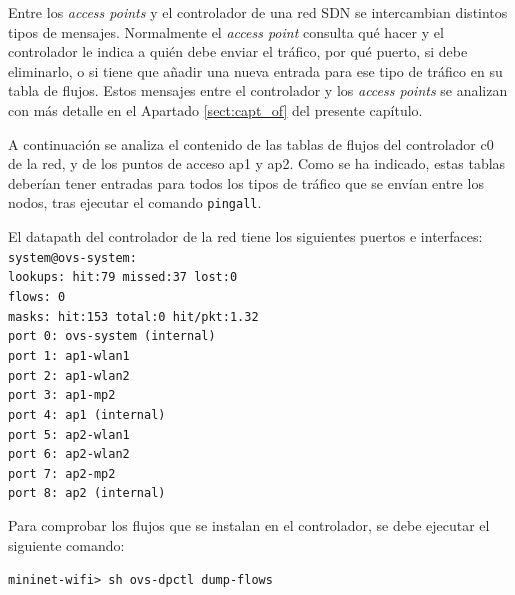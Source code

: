 \documentclass[a4paper,12pt,twoside,spanish]{book}
\begin{document}
Entre los \textit{access points} y el controlador de una red SDN se intercambian distintos tipos de mensajes. Normalmente el \textit{access point} consulta qué hacer y el controlador le indica a quién debe enviar el tráfico, por qué puerto, si debe eliminarlo, o si tiene que añadir una nueva entrada para ese tipo de tráfico en su tabla de flujos. Estos mensajes entre el controlador y los \textit{access points} se analizan con más detalle en el Apartado \ref{sect:capt_of} del presente capítulo.\par 

A continuación se analiza el contenido de las tablas de flujos del controlador c0 de la red, y de los puntos de acceso ap1 y ap2. Como se ha indicado, estas tablas deberían tener entradas para todos los tipos de tráfico que se envían entre los nodos, tras ejecutar el comando \texttt{pingall}.\par 

\hspace{0.5cm}

El datapath del controlador de la red tiene los siguientes puertos e interfaces:
\texttt{\\
\noindent system@ovs-system:\\
	\indent lookups: hit:79 missed:37 lost:0\\
	\indent	flows: 0\\
	\indent	masks: hit:153 total:0 hit/pkt:1.32\\
	\indent	port 0: ovs-system (internal)\\
	\indent	port 1: ap1-wlan1\\
	\indent	port 2: ap1-wlan2\\
	\indent	port 3: ap1-mp2\\
	\indent	port 4: ap1 (internal)\\
	\indent	port 5: ap2-wlan1\\
	\indent	port 6: ap2-wlan2\\
	\indent	port 7: ap2-mp2\\
	\indent	port 8: ap2 (internal)\\
}\par

Para comprobar los flujos que se instalan en el controlador, se debe ejecutar el siguiente comando:\par 

\begin{center} 
	\texttt{mininet-wifi> sh ovs-dpctl dump-flows}
\end{center}
\end{document}
